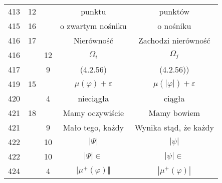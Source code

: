 \documentclass[a4paper,11pt]{article}
\numberwithin{equation}{section}
\begin{document}
\begin{center}
\begin{tabular}{|c|c|c|c|c|}
    413 & 12 & & punktu & punktów \\
    415 & 16 & & o zwartym nośniku & o nośniku \\
    416 & 17 & & Nierówność & Zachodzi nierówność \\
    416 & & 12 & $\Omega_{ i }$ & $\Omega_{ j }$ \\
    417 & &  9 & (4.2.56) & (4.2.56)) \\
    419 & 15 & & $\mu( \varphi ) + \varepsilon$ & $\mu( | \varphi | ) + \varepsilon$ \\
    420 & &  4 & nieciągła & ciągła \\
    421 & 18 & & Mamy oczywiście & Mamy bowiem \\
    421 & &  9 & Mało tego, każdy & Wynika stąd, że każdy \\
    422 & & 10 & $| \Psi | $ & $| \psi |$ \\
    422 & & 10 & $| \Psi | \in$ & $| \psi | \in$ \\
    424 & &  4 & $| \mu^{ + }( \varphi ) \Vert$ & $| \mu^{ + }( \varphi ) |$ \\
    \hline
  \end{tabular}






\end{center}
\end{document}
